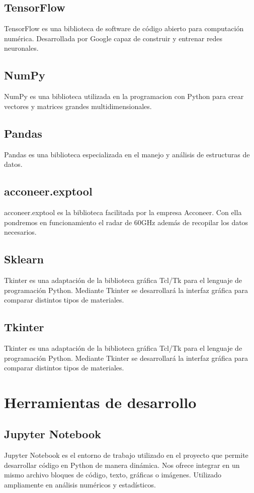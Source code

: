 \subsection{TensorFlow}
TensorFlow es una biblioteca de software de código abierto para computación numérica. Desarrollada por Google capaz de construir y entrenar redes neuronales.

\subsection{NumPy}
NumPy es una biblioteca utilizada en la programacion con Python para crear vectores y matrices grandes multidimensionales.

\subsection{Pandas}
Pandas es una biblioteca especializada en el manejo y análisis de estructuras de datos.

\subsection{acconeer.exptool}
acconeer.exptool es la biblioteca facilitada por la empresa Acconeer. Con ella pondremos en funcionamiento el radar de 60GHz además de recopilar los datos necesarios.

\subsection{Sklearn}
Tkinter es una adaptación de la biblioteca gráfica Tcl/Tk para el lenguaje de programación Python. Mediante Tkinter se desarrollará la interfaz gráfica para comparar distintos tipos de materiales.

\subsection{Tkinter}
Tkinter es una adaptación de la biblioteca gráfica Tcl/Tk\cite{Tcl} para el lenguaje de programación Python. Mediante Tkinter se desarrollará la interfaz gráfica para comparar distintos tipos de materiales.

\section{Herramientas de desarrollo}
\subsection{Jupyter Notebook}
Jupyter Notebook es el entorno de trabajo utilizado en el proyecto que permite desarrollar código en Python de manera dinámica. Nos ofrece integrar en un mismo archivo bloques de código, texto, gráficas o imágenes. Utilizado ampliamente en análisis numéricos y estadísticos.

